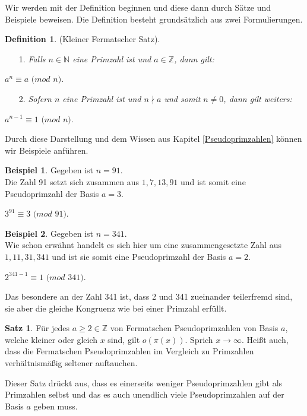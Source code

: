 \documentclass[12pt,a4paper]{article}
\theoremstyle{definition}
\newtheorem{defi}{Definition}[section]
\newtheorem{satz}{Satz}[subsection]
\newtheorem{bsp}{Beispiel}[subsection]
\begin{document}
Wir werden mit der Definition beginnen und diese dann durch Sätze und Beispiele beweisen. 
Die Definition besteht grundsätzlich aus zwei Formulierungen.
\begin{defi}(Kleiner Fermatscher Satz). \label{Kleiner fermat'sche Satz}
\begin{enumerate}
    \item[1.]\textit{Falls $n \in \mathbb{N}$ eine Primzahl ist und $a \in \mathbb{Z}$, dann gilt:}\end{enumerate}
\begin{center}
$a^{n} \equiv a$ $(mod$ $n)$.
\end{center}
\begin{enumerate}
    \item[2.]\textit{Sofern $n$ eine Primzahl ist und $n \nmid a$ und somit $n \neq 0$, dann gilt weiters:}\end{enumerate}
\begin{center}
$a^{n-1} \equiv 1$ $(mod$ $n)$.
\end{center}\end{defi}

Durch diese Darstellung und dem Wissen aus Kapitel \ref{Pseudoprimzahlen} können wir Beispiele anführen.
\begin{bsp} Gegeben ist $n = 91$.\\
Die Zahl 91 setzt sich zusammen aus $1, 7, 13, 91$ und ist somit eine Pseudoprimzahl der Basis $a = 3$.
\begin{center}
$3^{91} \equiv 3$ $(mod$ $91)$.
\end{center}\end{bsp}
\begin{bsp} Gegeben ist $n = 341$.\\
Wie schon erwähnt handelt es sich hier um eine zusammengesetzte Zahl aus $1, 11, 31, 341$ und ist sie somit eine Pseudoprimzahl der Basis $a = 2$.
\begin{center}
$2^{341-1} \equiv 1$ $(mod$ $341)$.
\end{center}\end{bsp}
Das besondere an der Zahl 341 ist, dass 2 und 341 zueinander teilerfremd sind, sie aber die gleiche Kongruenz wie bei einer Primzahl erfüllt.

\begin{satz}
Für jedes $a \geq 2 \in \mathbb{Z}$ von Fermatschen Pseudoprimzahlen von Basis $a$, welche kleiner oder gleich $x$ sind, gilt $o(\pi(x))$.
Sprich $x \rightarrow \infty$.
Heißt auch, dass die Fermatschen Pseudoprimzahlen im Vergleich zu Primzahlen verhältnismäßig seltener auftauchen.
\end{satz}
Dieser Satz drückt aus, dass es einerseits weniger Pseudoprimzahlen gibt als Primzahlen selbst und das es auch unendlich viele Pseudoprimzahlen auf der Basis $a$ geben muss.
\end{document}
